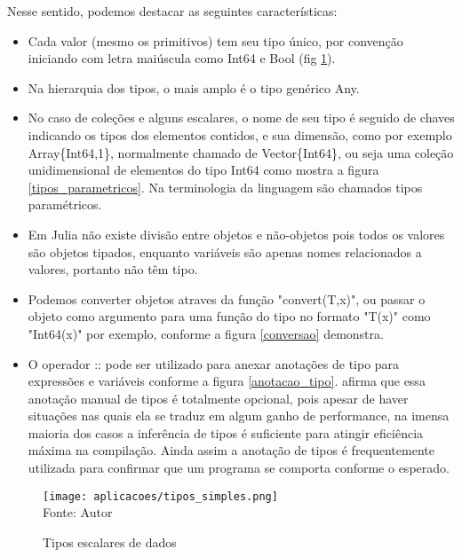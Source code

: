 Nesse sentido, podemos destacar as seguintes características: 
\begin{itemize}
    \item Cada valor (mesmo os primitivos) tem seu tipo único, por convenção iniciando com letra maiúscula como Int64 e Bool (fig \ref{tipos_escalares}). 
    \item Na hierarquia dos tipos, o mais amplo é o tipo genérico Any.
    \item No caso de coleções e alguns escalares, o nome de seu tipo é seguido de chaves indicando os tipos dos elementos contidos, e sua dimensão, como por exemplo Array\{Int64,1\}, normalmente chamado de Vector\{Int64\}, ou seja uma coleção unidimensional de elementos do tipo Int64 como mostra a figura \ref{tipos_parametricos}. Na terminologia da linguagem são chamados tipos paramétricos.  
    \item Em Julia não existe divisão entre objetos e não-objetos pois todos os valores são objetos tipados, enquanto variáveis são apenas nomes relacionados a valores, portanto não têm tipo. 
    \item Podemos converter objetos atraves da função "convert(T,x)", ou passar o objeto como argumento para uma função do tipo no formato "T(x)" como "Int64(x)" por exemplo, conforme a figura \ref{conversao} demonstra. 
    \item O operador :: pode ser utilizado para anexar anotações de tipo para expressões e variáveis conforme a figura \ref{anotacao_tipo}. \cite{Bezanson2017} afirma que essa anotação manual de tipos é totalmente opcional, pois apesar de haver situações nas quais ela se traduz em algum ganho de performance, na imensa maioria dos casos a inferência de tipos é suficiente para atingir eficiência máxima na compilação. Ainda assim a anotação de tipos é frequentemente utilizada para confirmar que um programa se comporta conforme o esperado. 
    
\end{itemize}


    \begin{figure}[H]
    \begin{center}
        \caption{Tipos escalares de dados} \label{tipos_escalares}
        \texttt{[image: aplicacoes/tipos\_simples.png]} \\
        {\tiny \sf Fonte: Autor}
    \end{center}
    \end{figure} 

